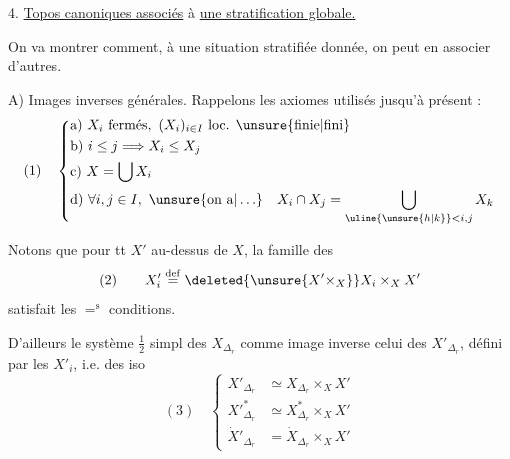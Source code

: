 4. \uline{Topos canoniques associés} à \uline{une stratification
globale.}

On va montrer comment, à une situation
stratifiée donnée, on peut en associer d'autres.

A) Images inverses générales. Rappelons les
axiomes utilisés jusqu'à présent :
\[
(1)\quad\left\{\begin{aligned}
&\text{a) }X_i\text{ fermés},\ (X_i)_{i\in I}\text{ loc. \unsure{finie|fini}}\\
&\text{b) }i\leq j\Longrightarrow X_i\leq X_j\\
&\text{c) }X=\bigcup X_i\\
&\text{d) }\forall i,j\in I,\ \unsure{\text{on a}|\ldots}\quad X_i\cap X_j=\bigcup_{\uline{\unsure{h|k}}<i,j}X_k
\end{aligned}\right.
\]

Notons que pour tt $X'$ au-dessus de
$X$, la famille des
\[
(2)\qquad X'_i\overset{\mathrm{def}}=\deleted{\unsure{X'\times_X}}X_i\times_X X'
\]
satisfait les  $=^{\mathrm s}$ conditions.

D'ailleurs le système $\frac12$ simpl des
$X_{\Delta_r}$  comme image inverse celui
des $X'_{\Delta_r}$, défini par les $X'_i$,
 i.e. des iso
\[
(3)\quad\left\{\begin{aligned}
X'_{\Delta_r}&\simeq X_{\Delta_r}\times_X X'\\
X'^{*}_{\Delta_r}&\simeq X^*_{\Delta_r}\times_X X'\\
\dot X'_{\Delta_r}&=\dot X_{\Delta_r}\times_X X'
\end{aligned}\right.
\]

